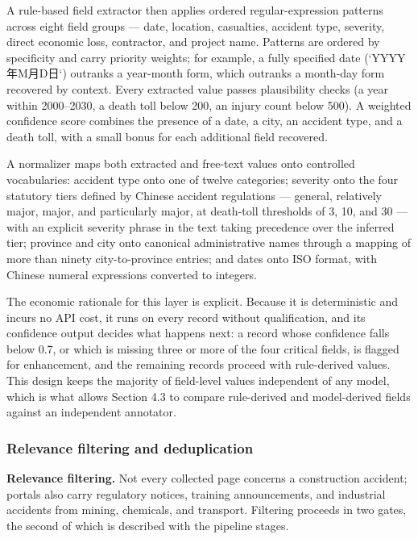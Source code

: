 \documentclass[11pt]{article}
\begin{document}
A rule-based field extractor then applies ordered regular-expression patterns across eight field groups --- date, location, casualties, accident type, severity, direct economic loss, contractor, and project name. Patterns are ordered by specificity and carry priority weights; for example, a fully specified date (`YYYY{\cjkfont 年}M{\cjkfont 月}D{\cjkfont 日}`) outranks a year-month form, which outranks a month-day form recovered by context. Every extracted value passes plausibility checks (a year within 2000--2030, a death toll below 200, an injury count below 500). A weighted confidence score combines the presence of a date, a city, an accident type, and a death toll, with a small bonus for each additional field recovered.

A normalizer maps both extracted and free-text values onto controlled vocabularies: accident type onto one of twelve categories; severity onto the four statutory tiers defined by Chinese accident regulations --- general, relatively major, major, and particularly major, at death-toll thresholds of 3, 10, and 30 --- with an explicit severity phrase in the text taking precedence over the inferred tier; province and city onto canonical administrative names through a mapping of more than ninety city-to-province entries; and dates onto ISO format, with Chinese numeral expressions converted to integers.

The economic rationale for this layer is explicit. Because it is deterministic and incurs no API cost, it runs on every record without qualification, and its confidence output decides what happens next: a record whose confidence falls below 0.7, or which is missing three or more of the four critical fields, is flagged for enhancement, and the remaining records proceed with rule-derived values. This design keeps the majority of field-level values independent of any model, which is what allows Section 4.3 to compare rule-derived and model-derived fields against an independent annotator.

\subsubsection{Relevance filtering and deduplication}
\textbf{Relevance filtering.} Not every collected page concerns a construction accident; portals also carry regulatory notices, training announcements, and industrial accidents from mining, chemicals, and transport. Filtering proceeds in two gates, the second of which is described with the pipeline stages.
\end{document}

